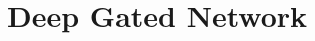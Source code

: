\section{Deep Gated Network}\label{sec:pathgate}
\begin{comment}
\begin{table}[!htb]
\begin{minipage}{0.5\columnwidth}
\resizebox{1.0\columnwidth}{!}{
\begin{tabular}{|l|}\hline
\multicolumn{1}{|c|}{Path Quantities}\\\hline 
$\I_0\colon [P]\ra [d_{in}]$, $\I_{l}\colon [P]\ra [w], l\in[d-1]$\\\hline
$v_t(p)\stackrel{def}=\Pi_{l=1}^d \Theta_t(l,\I_{l-1}(p),\I_l(p))$ \\\hline
$A_{t}(x,p)\stackrel{def}{=}\Pi_{l=1}^{d-1} G_{x,t}(l,\I_l(p))$\\\hline
\end{tabular}
}
\end{minipage}
\begin{minipage}{0.5\columnwidth}
\resizebox{\columnwidth}{!}{
\begin{tabular}{|c|c|c|}\hline
&Gating Network & Weight Network\\\hline
Input Layer&$z_{x,\Tg_t}(0)=x$ & $z_{x,\Tv_t}(0)=x$ \\\hline
Pre-activation& $q_{x,\Tg_t}(l)={\Tg_t(l)}^\top z_{x,\Tg_t}(l-1)$ & $q_{x,\Tv_t}(l)={\Tv_t(l)}^\top z_{x,\Tv_t}(l-1)$\\\hline
Layer Output& $z_{x,\Tg_t}(l)=q_{x,\Tg_t}(l)\odot G_{x,\Tg}(l)$ & $z_{x,\Tv_t}(l)=q_{x,\Tv_t}(l)\odot G_{x,\Tg_t}(l)$ \\\hline
Gating& \multicolumn{2}{|c|}{$\hat{y}_{t}(x)={\Tv_t(d)}^\top z_{x,\Tv_t}(d-1)$}\\\hline 
 &\multicolumn{2}{|c|}{$\begin{aligned}\beta >0: G_{x,\Tg_t}(l,i)&=\chi_{\epsilon}(-\beta q_{x,\Tg_t}(l,i)), \\ \beta=\infty: G_{x,\Tg_t}(l,i)&=\mathbbm{1}_{\{q_{x,\Tg_t}(l,i)>0\}}\end{aligned}$}\\\hline 
\end{tabular}
}
\end{minipage}
\caption{Here $\Theta(l,i,j)$ denotes the weight connecting node $i$ of layer $l-1$ to node $j$ of layer $l$, and $\odot$ stands for the \emph{Hadamard} product.}
\label{tb:dgn-path}
\end{table}



\end{comment}
